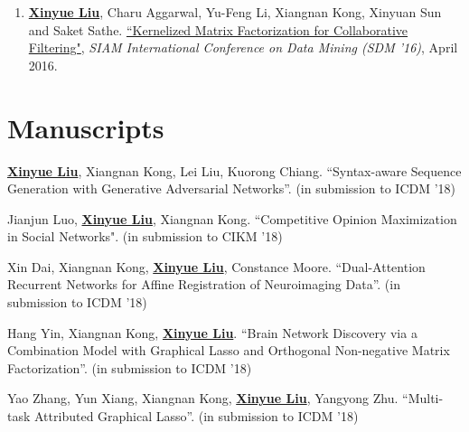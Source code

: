 \documentclass[a4paper,10pt]{article} %
\begin{document}
\begin{enumerate}[label=(C\arabic*).]
	\item  \label{sdm16}
    \textbf{\underline{Xinyue Liu}}, Charu Aggarwal, Yu-Feng Li, Xiangnan Kong, Xinyuan Sun and Saket Sathe. 
	 \href{http://cinv.ro/files/SDM16.pdf}
	 {``Kernelized Matrix Factorization for Collaborative Filtering"}, 
	 \emph{SIAM International Conference on Data Mining (SDM '16)}, April 2016.
\end{enumerate}

\section{Manuscripts}
\begin{enumerate}[label=(M\arabic*).]
    {\item \label{treegan} 
    \textbf{\underline{Xinyue Liu}}, Xiangnan Kong, Lei Liu, Kuorong Chiang. 
    ``Syntax-aware Sequence Generation with Generative Adversarial Networks''. 
    (in submission to ICDM '18)}

    {\item \label{COM} 
    Jianjun Luo, \textbf{\underline{Xinyue Liu}}, Xiangnan Kong. 
    ``Competitive Opinion Maximization in Social Networks". 
    (in submission to CIKM '18)}

    {\item \label{DROM}
    Xin Dai, Xiangnan Kong, \textbf{\underline{Xinyue Liu}}, Constance Moore. 
    ``Dual-Attention Recurrent Networks for Affine Registration of Neuroimaging Data''. 
    (in submission to ICDM '18)}

    {\item \label{CGL}
    Hang Yin, Xiangnan Kong, \textbf{\underline{Xinyue Liu}}. 
    ``Brain Network Discovery via a Combination Model with Graphical Lasso and Orthogonal Non-negative Matrix Factorization''. 
    (in submission to ICDM '18)}

    {\item \label{MAGL}
    Yao Zhang, Yun Xiang, Xiangnan Kong, \textbf{\underline{Xinyue Liu}}, Yangyong Zhu. 
    ``Multi-task Attributed Graphical Lasso''. 
    (in submission to ICDM '18)}

\end{enumerate}
\end{document}
